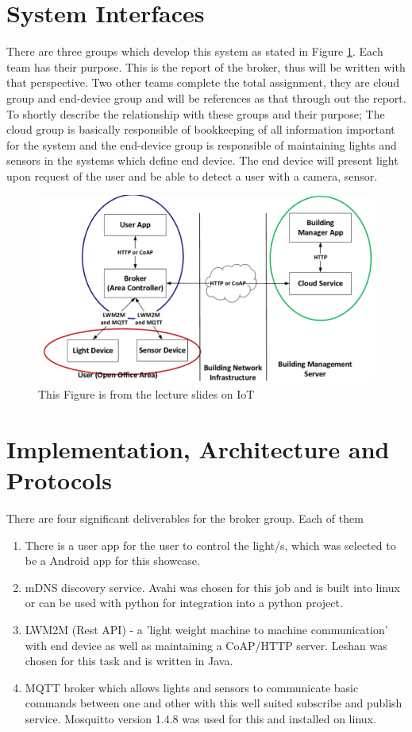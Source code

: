 \documentclass[conference]{IEEEtran}
\begin{document}
\section{System Interfaces}
There are three groups which develop this system as stated in Figure \ref{fig:fig1}.
Each team has their purpose. This is the report of the broker, thus will be written with that perspective. Two other teams complete the total assignment, they are cloud group and end-device group and will be references as that through out the report. To shortly describe the relationship with these groups and their purpose; The cloud group is basically responsible of bookkeeping of all information important for the system and the end-device group is responsible of maintaining lights and sensors in the systems which define end device. The end device will present light upon request of the user and be able to detect a user with a camera, sensor.
\begin{figure}[h]
	\begin{center}
		\includegraphics[width=1\linewidth]{img/design}
		\caption{This Figure is from the lecture slides on IoT \cite{slides}}
		\label{fig:fig1}
	\end{center}
\end{figure}


\section{Implementation, Architecture and Protocols}

There are four significant deliverables for the broker group. Each of them 
\begin{enumerate}
	\item There is a user app for the user to control the light/s, which was selected to be a Android app for this showcase.
	\item mDNS discovery service. Avahi was chosen for this job and is built into linux or can be used with python for integration into a python project.
	\item LWM2M (Rest API) - a 'light weight machine to machine communication' with end device as well as maintaining a CoAP/HTTP server. Leshan was chosen for this task and is written in Java.
	\item MQTT broker which allows lights and sensors to communicate basic commands between one and other with this well suited subscribe and publish service. Mosquitto version 1.4.8 was used for this and installed on linux.
\end{enumerate}
\end{document}
